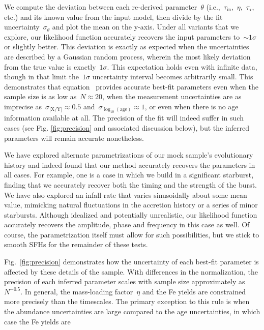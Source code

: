 \documentclass[ms.tex]{subfiles}
\begin{document}
We compute the deviation between each re-derived parameter~$\theta$
(i.e.,~$\tau_\text{in}$,~$\eta$,~$\tau_\star$, etc.) and its known value from
the input model, then divide by the fit uncertainty~$\sigma_\theta$ and plot
the mean on the y-axis.
Under all variants that we explore, our likelihood function accurately recovers
the input parameters to~$\sim1\sigma$ or slightly better.
This deviation is exactly as expected when the uncertainties are described by a
Gaussian random process, wherein the most likely deviation from the true value
is exactly~$1\sigma$.
This expectation holds even with infinite data, though in that limit
the~$1\sigma$ uncertainty interval becomes arbitrarily small.
This demonstrates that equation~ provides accurate best-fit
parameters even when the sample size is as low as~$N \approx 20$, when the
measurement uncertainties are as imprecise as~$\sigma_\text{[X/Y]} \approx 0.5$
and~$\sigma_{\log_{10}(\text{age})} \approx 1$, or even when there is no age
information available at all.
The precision of the fit will indeed suffer in such cases (see Fig.
\ref{fig:precision} and associated discussion below), but the inferred
parameters will remain accurate nonetheless.
\par
We have explored alternate parametrizations of our mock sample's evolutionary
history and indeed found that our method accurately recovers the parameters
in all cases.
For example, one is a case in which we build in a significant starburst,
finding that we accurately recover both the timing and the strength of the
burst.
We have also explored an infall rate that varies sinusoidally about some mean
value, mimicking natural fluctuations in the accretion history or a series of
minor starbursts.
Although idealized and potentially unrealistic, our likelihood function
accurately recovers the amplitude, phase and frequency in this case as well.
Of course, the parametrization itself must allow for such possibilities, but
we stick to smooth SFHs for the remainder of these tests.
\par
Fig.~\ref{fig:precision} demonstrates how the uncertainty of each best-fit
parameter is affected by these details of the sample.
With differences in the normalization, the precision of each inferred parameter
scales with sample size approximately as~$N^{-0.5}$.
In general, the mass-loading factor~$\eta$ and the Fe yields are constrained
more precisely than the timescales.
The primary exception to this rule is when the abundance uncertainties are
large compared to the age uncertainties, in which case the Fe yields are
\end{document}
